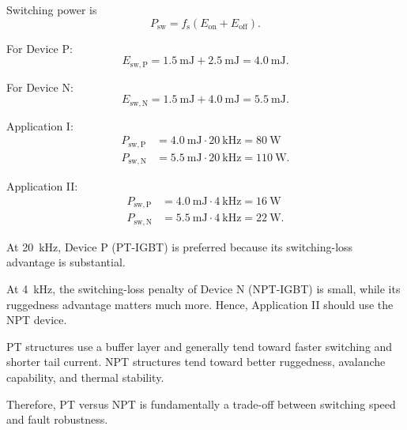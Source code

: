 \begin{solutionblock}
    Switching power is
    \begin{equation}
        P_\mathrm{sw} = f_\mathrm{s} (E_\mathrm{on} + E_\mathrm{off}).
    \end{equation}

    For Device P:
    \begin{equation}
        E_\mathrm{sw,P} = \SI{1.5}{\milli\joule} + \SI{2.5}{\milli\joule} = \SI{4.0}{\milli\joule}.
    \end{equation}

    For Device N:
    \begin{equation}
        E_\mathrm{sw,N} = \SI{1.5}{\milli\joule} + \SI{4.0}{\milli\joule} = \SI{5.5}{\milli\joule}.
    \end{equation}

    Application I:
    \begin{align}
        P_\mathrm{sw,P} &= \SI{4.0}{\milli\joule} \cdot \SI{20}{\kilo\hertz} = \SI{80}{\watt} \\
        P_\mathrm{sw,N} &= \SI{5.5}{\milli\joule} \cdot \SI{20}{\kilo\hertz} = \SI{110}{\watt}.
    \end{align}

    Application II:
    \begin{align}
        P_\mathrm{sw,P} &= \SI{4.0}{\milli\joule} \cdot \SI{4}{\kilo\hertz} = \SI{16}{\watt} \\
        P_\mathrm{sw,N} &= \SI{5.5}{\milli\joule} \cdot \SI{4}{\kilo\hertz} = \SI{22}{\watt}.
    \end{align}
\end{solutionblock}


\begin{solutionblock}
    At \SI{20}{\kilo\hertz}, Device P (PT-IGBT) is preferred because its switching-loss advantage is substantial.

    At \SI{4}{\kilo\hertz}, the switching-loss penalty of Device N (NPT-IGBT) is small, while its ruggedness advantage matters much more.
    Hence, Application II should use the NPT device.
\end{solutionblock}


\begin{solutionblock}
    PT structures use a buffer layer and generally tend toward faster switching and shorter tail current.
    NPT structures tend toward better ruggedness, avalanche capability, and thermal stability.

    Therefore, PT versus NPT is fundamentally a trade-off between switching speed and fault robustness.
\end{solutionblock}


